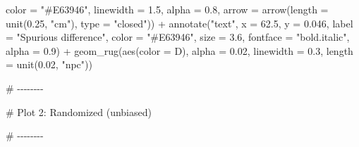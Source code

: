 \documentclass[
  letterpaper,
  DIV=11,
  numbers=noendperiod]{scrreprt}
\newenvironment{Shaded}{\begin{snugshade}}{\end{snugshade}}
\newcommand{\AttributeTok}[1]{\textcolor[rgb]{0.40,0.45,0.13}{#1}}
\newcommand{\CommentTok}[1]{\textcolor[rgb]{0.37,0.37,0.37}{#1}}
\newcommand{\FloatTok}[1]{\textcolor[rgb]{0.68,0.00,0.00}{#1}}
\newcommand{\FunctionTok}[1]{\textcolor[rgb]{0.28,0.35,0.67}{#1}}
\newcommand{\NormalTok}[1]{\textcolor[rgb]{0.00,0.23,0.31}{#1}}
\newcommand{\SpecialCharTok}[1]{\textcolor[rgb]{0.37,0.37,0.37}{#1}}
\newcommand{\StringTok}[1]{\textcolor[rgb]{0.13,0.47,0.30}{#1}}
\begin{document}
\begin{Shaded}
\begin{Highlighting}[]
\AttributeTok{color =} \StringTok{"\#E63946"}\NormalTok{, }\AttributeTok{linewidth =} \FloatTok{1.5}\NormalTok{, }\AttributeTok{alpha =} \FloatTok{0.8}\NormalTok{,}
\AttributeTok{arrow =} \FunctionTok{arrow}\NormalTok{(}\AttributeTok{length =} \FunctionTok{unit}\NormalTok{(}\FloatTok{0.25}\NormalTok{, }\StringTok{"cm"}\NormalTok{), }\AttributeTok{type =} \StringTok{"closed"}\NormalTok{)) }\SpecialCharTok{+}
\FunctionTok{annotate}\NormalTok{(}\StringTok{"text"}\NormalTok{, }\AttributeTok{x =} \FloatTok{62.5}\NormalTok{, }\AttributeTok{y =} \FloatTok{0.046}\NormalTok{,}
\AttributeTok{label =} \StringTok{"Spurious difference"}\NormalTok{,}
\AttributeTok{color =} \StringTok{"\#E63946"}\NormalTok{, }\AttributeTok{size =} \FloatTok{3.6}\NormalTok{, }\AttributeTok{fontface =} \StringTok{"bold.italic"}\NormalTok{, }\AttributeTok{alpha =} \FloatTok{0.9}\NormalTok{) }\SpecialCharTok{+}
\FunctionTok{geom\_rug}\NormalTok{(}\FunctionTok{aes}\NormalTok{(}\AttributeTok{color =}\NormalTok{ D), }\AttributeTok{alpha =} \FloatTok{0.02}\NormalTok{, }\AttributeTok{linewidth =} \FloatTok{0.3}\NormalTok{, }\AttributeTok{length =} \FunctionTok{unit}\NormalTok{(}\FloatTok{0.02}\NormalTok{, }\StringTok{"npc"}\NormalTok{))}

\CommentTok{\# {-}{-}{-}{-}{-}{-}{-}{-}}

\CommentTok{\# Plot 2: Randomized (unbiased)}

\CommentTok{\# {-}{-}{-}{-}{-}{-}{-}{-}}


\end{Highlighting}
\end{Shaded}
\end{document}
